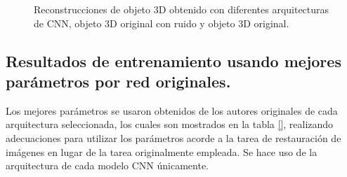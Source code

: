 \documentclass[10pt,letterpaper]{article}
\begin{document}
\begin{figure}[H]
\begin{center}
{            \label{tif146}}
        \caption{Reconstrucciones de objeto 3D obtenido con diferentes arquitecturas de CNN, objeto 3D original con ruido y objeto 3D original.}
        \label{tif98100102104106}
      \end{center}
\end{figure}


\subsection*{Resultados de entrenamiento usando mejores parámetros por red originales.}

Los mejores parámetros se usaron obtenidos de los autores originales de cada arquitectura seleccionada, los cuales son mostrados en la tabla \ref{}, realizando adecuaciones para utilizar los parámetros acorde a la tarea de restauración de imágenes en lugar de la tarea originalmente empleada. Se hace uso de la arquitectura de cada modelo CNN únicamente.
\end{document}
